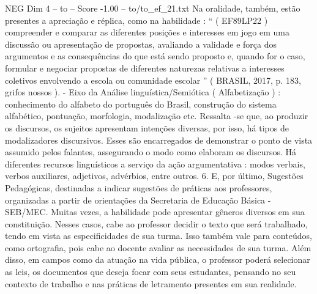 \begin{textsample}{NEG Dim 4 – to – Score -1.00 – to/to\_ef\_21.txt}
Na oralidade, também, estão presentes a apreciação e réplica, como na habilidade : “ ( EF89LP22 ) compreender e comparar as diferentes posições e interesses em jogo em uma discussão ou apresentação de propostas, avaliando a validade e força dos argumentos e as consequências do que está sendo proposto e, quando for o caso, formular e negociar propostas de diferentes naturezas relativas a interesses coletivos envolvendo a escola ou comunidade escolar ” ( BRASIL, 2017, p. 183, grifos nossos ). - Eixo da Análise linguística/Semiótica ( Alfabetização ) : conhecimento do alfabeto do português do Brasil, construção do sistema alfabético, pontuação, morfologia, modalização etc.
Ressalta -se que, ao produzir os discursos, os sujeitos apresentam intenções diversas, por isso, há tipos de modalizadores discursivos.
Esses são encarregados de demonstrar o ponto de vista assumido pelos falantes, assegurando o modo como elaboram os discursos.
Há diferentes recursos linguísticos a serviço da ação argumentativa : modos verbais, verbos auxiliares, adjetivos, advérbios, entre outros. 6.
E, por último, Sugestões Pedagógicas, destinadas a indicar sugestões de práticas aos professores, organizadas a partir de orientações da Secretaria de Educação Básica - SEB/MEC.
Muitas vezes, a habilidade pode apresentar gêneros diversos em sua constituição.
Nesses casos, cabe ao professor decidir o texto que será trabalhado, tendo em vista as especificidades de sua turma.
Isso também vale para conteúdos, como ortografia, pois cabe ao docente avaliar as necessidades de sua turma.
Além disso, em campos como da atuação na vida pública, o professor poderá selecionar as leis, os documentos que deseja focar com seus estudantes, pensando no seu contexto de trabalho e nas práticas de letramento presentes em sua realidade.

\end{textsample}
